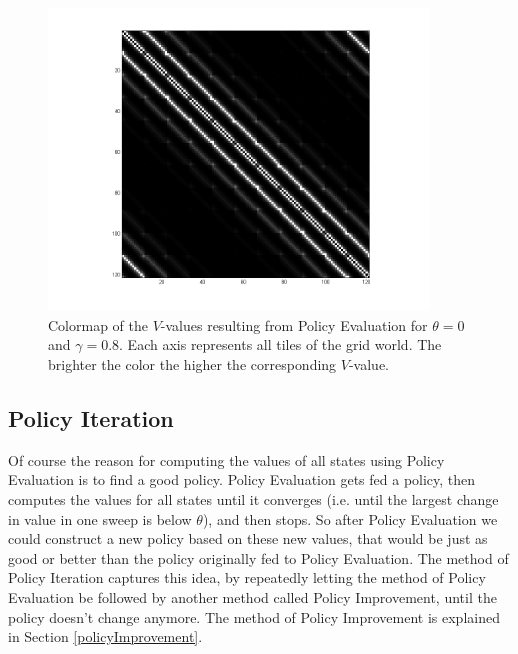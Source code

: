 \documentclass{article}
\begin{document}
\begin{figure}[htb]
		\centering
        \includegraphics[width=0.9\textwidth]{VMatrixPolicyEvaluation.png}
        
        \caption{	 Colormap of the $V$-values resulting from Policy Evaluation for
        			 $\theta=0$ and $\gamma = 0.8$. \newline
        			 Each axis represents all tiles of the grid world.
        			 The brighter the color the higher the corresponding $V$-value.}  
        \label{colormapPolicyEvaluation}      
\end{figure}


\subsection{Policy Iteration}\label{sec:policyIteration}
Of course the reason for computing the values of all states using Policy Evaluation is to find a good policy. Policy Evaluation gets fed a policy, then computes the values for all states until it converges (i.e. until the largest change in value in one sweep is below $\theta$), and then stops. So after Policy Evaluation we could construct a new policy based on these new values, that would be just as good or better than the policy originally fed to Policy Evaluation. The method of Policy Iteration captures this idea, by repeatedly letting the method of Policy Evaluation be followed by another method called Policy Improvement, until the policy doesn't change anymore. The method of Policy Improvement is explained in Section \ref{policyImprovement}.
\end{document}
